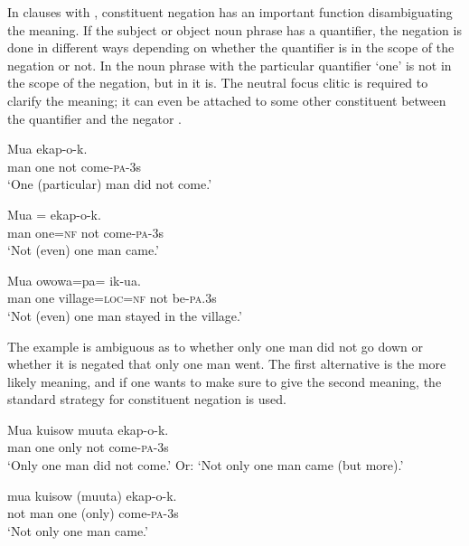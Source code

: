 In clauses with , constituent negation has an important function disambiguating the meaning. If the subject or object noun phrase has a quantifier, the negation is done in different ways depending on whether the quantifier is in the scope of the negation or not. In  the noun phrase with the particular quantifier  `one' is not in the scope of the negation, but in  it is. The neutral focus clitic is required to clarify the meaning; it can even be attached to some other constituent between the quantifier and the negator .

\ea%
\label{ex:6:x1142}
\gll Mua      ekap-o-k. \\
man  one  not  come-\textsc{pa}-3s\\
\glt `One (particular) man did not come.'
\z

\ea%
\label{ex:6:x1143}
\gll Mua  =    ekap-o-k. \\
man  one=\textsc{nf}  not  come-\textsc{pa}-3s\\
\glt `Not (even) one man came.'
\z

\ea%
\label{ex:6:x1147}
\gll Mua    owowa=pa=    ik-ua. \\
man  one  village=\textsc{loc}=\textsc{nf}  not  be-\textsc{pa}.3s\\
\glt `Not (even) one man stayed in the village.'
\z

The example  is ambiguous as to whether only one man did not go down or whether it is negated that only one man went. The first alternative is the more likely meaning, and if one wants to make sure to give the second meaning, the standard strategy for constituent negation  is used.

\ea%
\label{ex:6:x1145}
\gll Mua  kuisow  muuta    ekap-o-k. \\
man  one  only  not  come-\textsc{pa}-3s\\
\glt `Only one man did not come.' Or: `Not only one man came (but more).'
\z

\ea%
\label{ex:6:x1144}
\gll {}  mua  kuisow  (muuta)  ekap-o-k. \\
not  man  one  (only)  come-\textsc{pa}-3s\\
\glt `Not only one man came.'
\z

